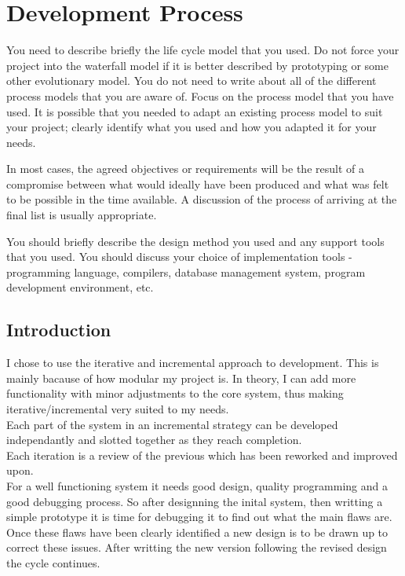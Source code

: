 \chapter{Development Process}

You need to describe briefly the life cycle model that you used. Do not force your project into the waterfall model if it is better described by prototyping or some other evolutionary model. You do not need to write about all of the different process models that you are aware of. Focus on the process model that you have used. It is possible that you needed to adapt an existing process model to suit your project; clearly identify what you used and how you adapted it for your needs.

In most cases, the agreed objectives or requirements will be the result of a compromise between what would ideally have been produced and what was felt to be possible in the time available. A discussion of the process of arriving at the final list is usually appropriate.

You should briefly describe the design method you used and any support tools that you used. You should discuss your choice of implementation tools - programming language, compilers, database management system, program development environment, etc.

\section{Introduction}
I chose to use the iterative and incremental approach to development.  This is mainly bacause of how modular my project is.  In theory, I can add more functionality with minor adjustments to the core system, thus making iterative/incremental very suited to my needs.
\\Each part of the system in an incremental strategy can be developed independantly and slotted together as they reach completion.
\\Each iteration is a review of the previous which has been reworked and improved upon.
\\For a well functioning system it needs good design, quality programming and a good debugging process.  So after designning the inital system, then writting a simple prototype it is time for debugging it to find out what the main flaws are.  Once these flaws have been clearly identified a new design is to be drawn up to correct these issues.  After writting the new version following the revised design the cycle continues.


